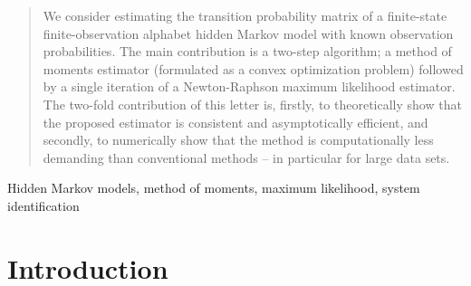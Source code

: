 \documentclass[journal]{IEEEtran}
\begin{document}
\begin{abstract}
    We consider estimating the transition probability matrix of a finite-state
    finite-observation alphabet hidden Markov model with known observation probabilities.
    The main contribution is a two-step algorithm; a method of moments estimator
    (formulated as a convex optimization problem) followed by a single iteration of
    a Newton-Raphson maximum likelihood estimator. The two-fold contribution of this
    letter is, firstly, to theoretically show that the proposed estimator is consistent
    and asymptotically efficient, and secondly, to numerically show that the method is
    computationally less demanding than conventional methods -- in particular for large
    data sets. 
\end{abstract}

\begin{IEEEkeywords}
    Hidden Markov models, method of moments, maximum likelihood, system identification
\end{IEEEkeywords}






%
\IEEEpeerreviewmaketitle

\section{Introduction}
% 
% 
% 
% 
\end{document}
